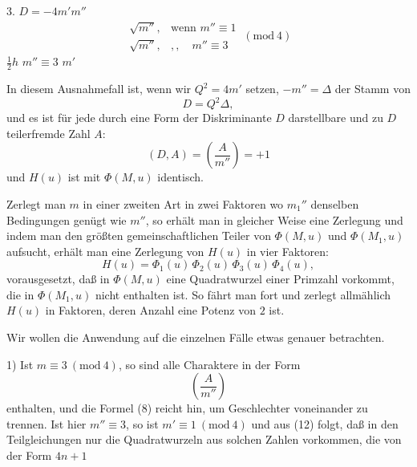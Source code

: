 3.  $D=-4m'm''$ 
\[
\begin{array}{ll}
\sqrt{m''}, & \text{wenn } m''\equiv 1 \\
\sqrt{m''}, & ,,\quad m''\equiv 3
\end{array}
\ (\mathrm{mod}\ 4)
\]
 $\tfrac12 h$  $m''\equiv 3$  $m'$ 

In diesem Ausnahmefall ist, wenn wir $Q^2=4m'$ setzen, $-m''=\varDelta$ der Stamm von
\[
D = Q^2\varDelta,
\]
und es ist für jede durch eine Form der Diskriminante $D$ darstellbare und zu $D$ teilerfremde Zahl $A$:
\[
(D,A) = \left(\frac{A}{m''}\right) = +1
\]
und $H(u)$ ist mit $\Phi(M,u)$ identisch.

Zerlegt man $m$ in einer zweiten Art in zwei Faktoren
wo $m_1''$ denselben Bedingungen genügt wie $m''$, so erhält man in gleicher Weise eine Zerlegung
und indem man den größten gemeinschaftlichen Teiler von $\Phi(M,u)$ und $\Phi(M_1,u)$ aufsucht, erhält man eine Zerlegung von $H(u)$ in vier Faktoren:
\[
H(u) = \Phi_1(u)\,\Phi_2(u)\,\Phi_3(u)\,\Phi_4(u),
\]
vorausgesetzt, daß in $\Phi(M,u)$ eine Quadratwurzel einer Primzahl vorkommt, die in $\Phi(M_1,u)$ nicht enthalten ist. So fährt man fort und zerlegt allmählich $H(u)$ in Faktoren, deren Anzahl eine Potenz von $2$ ist.

Wir wollen die Anwendung auf die einzelnen Fälle etwas genauer betrachten.

1) Ist $m\equiv 3 \ (\mathrm{mod}\ 4)$, so sind alle Charaktere in der Form
\[
\left(\frac{A}{m''}\right)
\]
enthalten, und die Formel (8) reicht hin, um  Geschlechter voneinander zu trennen. Ist hier $m''\equiv 3$, so ist $m'\equiv 1 \ (\mathrm{mod}\ 4)$ und aus (12) folgt, daß in den Teilgleichungen nur die Quadratwurzeln aus solchen Zahlen vorkommen, die von der Form $4n+1$
